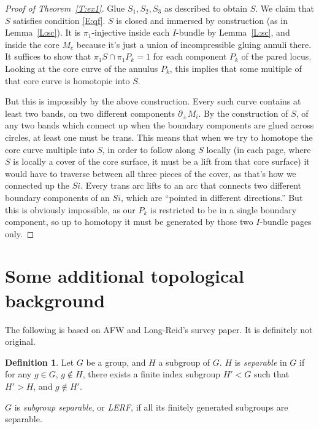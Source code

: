 \documentclass[12pt]{amsart}
\theoremstyle{definition}
\newtheorem{defn}[theorem]{Definition}
\theoremstyle{remark}
\newcommand{\bd}{\partial}
\begin{document}
\begin{proof}[Proof of Theorem~\ref{T:ex1}]
Glue $S_1,S_2,S_3$ as described to obtain $S$. We claim that $S$ satisfies
condition \eqref{E:qf}. $S$ is closed and immersed by construction (as in
Lemma~\ref{L:sc}). It is $\pi_1$-injective inside each $I$-bundle by
Lemma~\ref{L:sc}, and inside the core $M_c$ because it's just a union of
incompressible gluing annuli there. It suffices to show that $\pi_1S \cap
\pi_1P_k = 1$ for each component $P_k$ of the pared locus. Looking at the core
curve of the annulus $P_k$, this implies that some multiple of that core curve
is homotopic into $S$.

But this is impossibly by the above construction. Every such curve contains at
least two bands, on two different components $\bd_\pm M_i$. By the construction
of $S$, of any two bands which connect up when the boundary components are
glued across circles, at least one must be trans. This means that when we try
to homotope the core curve multiple into $S$, in order to follow along $S$
locally (in each page, where $S$ is locally a cover of the core surface, it
must be a lift from that core surface) it would have to traverse between all
three pieces of the cover, as that's how we connected up the $Si$. Every trans
arc lifts to an arc that connects two different boundary components of an $Si$,
which are ``pointed in different directions.'' But this is obviously
impossible, as our $P_k$ is restricted to be in a single boundary component, so
up to homotopy it must be generated by those two $I$-bundle pages only.

\end{proof}

\section{Some additional topological background}

The following is based on AFW and Long-Reid's survey paper. It is definitely
not original.

\begin{defn}

Let $G$ be a group, and $H$ a subgroup of $G$. $H$ is \emph{separable} in $G$
if for any $g \in G$, $g \notin H$, there exists a finite index subgroup $H'<G$
such that $H'>H$, and $g \notin H'$.

$G$ is \emph{subgroup separable}, or \emph{LERF}, if all its finitely generated
subgroups are separable.

\end{defn}
\end{document}
